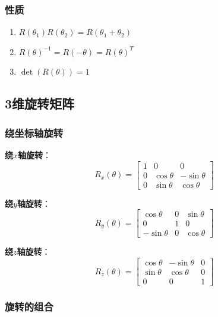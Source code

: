 \documentclass[12pt,a4paper]{article}
\begin{document}
\subsubsection{性质}

\begin{enumerate}
\item $R(\theta_1) R(\theta_2) = R(\theta_1 + \theta_2)$
\item $R(\theta)^{-1} = R(-\theta) = R(\theta)^T$
\item $\det(R(\theta)) = 1$
\end{enumerate}

\subsection{3维旋转矩阵}

\subsubsection{绕坐标轴旋转}

\textbf{绕$x$轴旋转}：
\begin{equation}
R_x(\theta) = \begin{bmatrix} 1 & 0 & 0 \\ 0 & \cos\theta & -\sin\theta \\ 0 & \sin\theta & \cos\theta \end{bmatrix}
\end{equation}

\textbf{绕$y$轴旋转}：
\begin{equation}
R_y(\theta) = \begin{bmatrix} \cos\theta & 0 & \sin\theta \\ 0 & 1 & 0 \\ -\sin\theta & 0 & \cos\theta \end{bmatrix}
\end{equation}

\textbf{绕$z$轴旋转}：
\begin{equation}
R_z(\theta) = \begin{bmatrix} \cos\theta & -\sin\theta & 0 \\ \sin\theta & \cos\theta & 0 \\ 0 & 0 & 1 \end{bmatrix}
\end{equation}

\subsubsection{旋转的组合}
\end{document}
